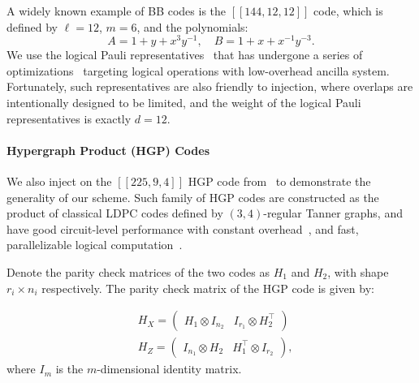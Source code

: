 A widely known example of BB codes is the $[[144,12,12]]$ code,
which is defined by $ \ell = 12 $, $ m = 6 $, and the polynomials:
\begin{equation}
    A=1+y+x^{3} y^{-1}, \quad B=1+x+x^{-1} y^{-3}.
\end{equation}
We use the logical Pauli representatives~\cite[Sec.~A.1]{yoder_tour_2025}
that has undergone a series of optimizations~\cite{bravyi_high-threshold_2024,
cross_improved_2024,williamson_low-overhead_2024,yoder_tour_2025}
targeting logical operations with low-overhead ancilla system.
Fortunately, such representatives are also friendly to injection,
where overlaps are intentionally designed to be limited,
and the weight of the logical Pauli representatives is exactly $ d=12 $.

\paragraph{Hypergraph Product (HGP) Codes}

We also inject on the $[[225,9,4]]$ HGP code 
from~\cite{xu_constant-overhead_2023} to demonstrate the generality of our scheme.
Such family of HGP codes are constructed as the product of classical LDPC codes defined by $(3,4)$-regular Tanner graphs, and have good circuit-level performance with constant overhead~\cite{xu_constant-overhead_2023},
and fast, parallelizable logical computation~\cite{xu_fast_2024}.

Denote the parity check matrices of the two codes as $H_1$ and $H_2$, with shape $ r_i \times n_i $ respectively.
The parity check matrix of the HGP code is given by:

\begin{equation}
    \begin{aligned}
    & H_X=\left(\begin{array}{ll}
    H_1 \otimes I_{n_2} & I_{r_1} \otimes H_2^\top
    \end{array}\right) \\
    & H_Z=\left(\begin{array}{ll}
    I_{n_1} \otimes H_2 & H_1^\top \otimes I_{r_2}
    \end{array}\right),
    \end{aligned}
\end{equation}
where $ I_{m} $ is the $ m $-dimensional identity matrix.

